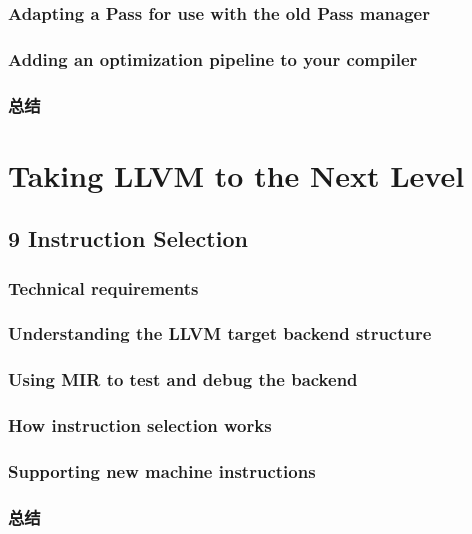 \documentclass[11pt,a4paper,UTF8]{ctexart}
\begin{document}
		\subsubsection{Adapting a Pass for use with the old Pass manager}
		\subsubsection{Adding an optimization pipeline to your compiler}
		\subsubsection{总结}
	
	\section{Taking LLVM to the Next Level}
	\subsection{9 Instruction Selection}
		\subsubsection{Technical requirements}
		\subsubsection{Understanding the LLVM target backend structure}
		\subsubsection{Using MIR to test and debug the backend}
		\subsubsection{How instruction selection works}		
		\subsubsection{Supporting new machine instructions}
		\subsubsection{总结}
\end{document}
